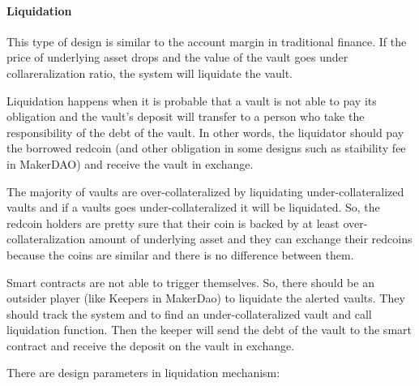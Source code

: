  
\paragraph{Liquidation}
This type of design is similar to the account margin in traditional finance. If the price of underlying asset drops and the value of the vault goes under collareralization ratio, the system will liquidate the vault.

Liquidation happens when it is probable that a vault is not able to pay its obligation and the vault's deposit will transfer to a person who take the responsibility of the debt of the vault. In other words, the liquidator should pay the borrowed redcoin (and other obligation in some designs such as staibility fee in MakerDAO) and receive the vault in exchange.

The majority of vaults are over-collateralized by liquidating under-collateralized vaults and if a vaults goes under-collateralized it will be liquidated. So, the redcoin holders are pretty sure that their coin is backed by at least over-collateralization amount of underlying asset and they can exchange their redcoins because the coins are similar and there is no difference between them.

Smart contracts are not able to trigger themselves. So, there should be an outsider player (like Keepers in MakerDao) to liquidate the alerted vaults. They should track the system and to find an under-collateralized vault and call liquidation function. Then the keeper will send the debt of the vault to the smart contract and receive the deposit on the vault in exchange.

There are design parameters in liquidation mechanism:

